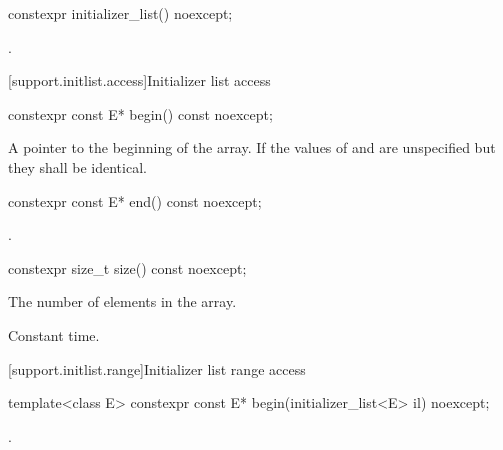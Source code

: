 %
\begin{itemdecl}
constexpr initializer_list() noexcept;
\end{itemdecl}

\begin{itemdescr}
\pnum
\ensures
{}.
\end{itemdescr}

[support.initlist.access]{Initializer list access}

%
\begin{itemdecl}
constexpr const E* begin() const noexcept;
\end{itemdecl}

\begin{itemdescr}
\pnum
\returns
A pointer to the beginning of the array. If  the
values of  and  are unspecified but they shall be
identical.
\end{itemdescr}

%
\begin{itemdecl}
constexpr const E* end() const noexcept;
\end{itemdecl}

\begin{itemdescr}
\pnum
\returns
{}.
\end{itemdescr}

%
\begin{itemdecl}
constexpr size_t size() const noexcept;
\end{itemdecl}

\begin{itemdescr}
\pnum
\returns
The number of elements in the array.

\pnum
\complexity
Constant time.
\end{itemdescr}

[support.initlist.range]{Initializer list range access}

%
\begin{itemdecl}
template<class E> constexpr const E* begin(initializer_list<E> il) noexcept;
\end{itemdecl}

\begin{itemdescr}
\pnum
\returns
{}.
\end{itemdescr}

